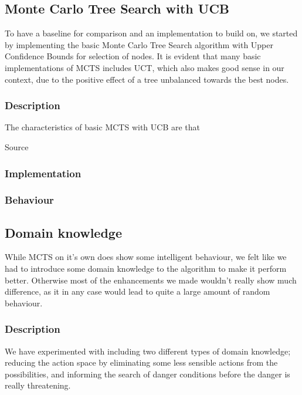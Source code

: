 \documentclass[10pt,a4paper]{article}
\begin{document}
\subsection{Monte Carlo Tree Search with UCB}
To have a baseline for comparison and an implementation to build on, we started by implementing the basic Monte Carlo Tree Search algorithm with Upper Confidence Bounds for selection of nodes. It is evident that many basic implementations of MCTS includes UCT\cite{mspacman}, which also makes good sense in our context, due to the positive effect of a tree unbalanced towards the best nodes.

\subsubsection{Description}
The characteristics of basic MCTS with UCB are that 

Source \cite{mctssurvey}

\subsubsection{Implementation}


\subsubsection{Behaviour}

\subsection{Domain knowledge}
While MCTS on it's own does show some intelligent behaviour, we felt like we had to introduce some domain knowledge to the algorithm to make it perform better. Otherwise most of the enhancements we made wouldn't really show much difference, as it in any case would lead to quite a large amount of random behaviour.

\subsubsection{Description}
We have experimented with including two different types of domain knowledge; reducing the action space by eliminating some less sensible actions from the possibilities, and informing the search of danger conditions before the danger is really threatening.
\end{document}
